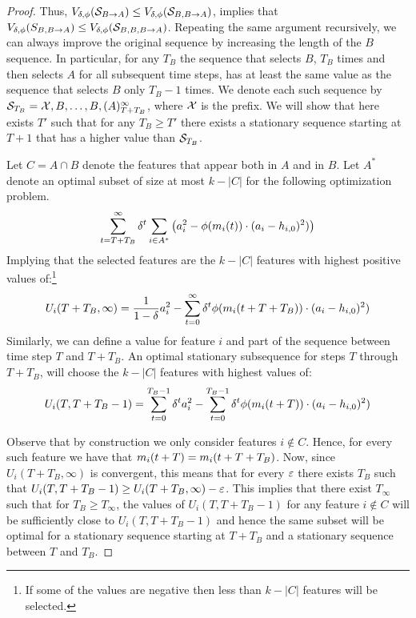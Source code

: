 \begin{proof}
Thus, $V_{\delta,\phi}(\mathcal{S}_{B \rightarrow A}) \leq V_{\delta,\phi}(\mathcal{S}_{B,B\rightarrow A})$,  implies that $V_{\delta,\phi}(S_{B,B \rightarrow A}) \leq V_{\delta,\phi}(\mathcal{S}_{B,B,B\rightarrow A})$. Repeating the same argument recursively, we can always improve the original sequence by increasing the length of the $B$ sequence. In particular, for any $T_B$ the sequence that selects $B$, $T_B$ times and then selects $A$ for all subsequent time steps, has at least the same value as the sequence that selects $B$ only $T_B-1$ times. We denote each such sequence by $\mathcal{S}_{T_B}= \mathcal{X},{B,\ldots, B}, (A)_{T+T_B}^{\infty}$, where $\mathcal{X}$ is the prefix. We will show that here exists $T'$ such that for any $T_B\geq T'$ there exists a stationary sequence starting at $T+1$ that has a higher value than $\mathcal{S}_{T_B}$.   




Let $C=A\cap B$ denote the features that appear both in $A$ and in $B$.
Let $A^*$ denote an optimal subset of size at most $k-|C| $ for the following optimization problem.
\begin{align*}
    \sum_{t=T+T_B}^\infty \delta^t \sum_{i\in A^*} \left( a_i^2 - \phi(m_{i}(t))\cdot(a_i-h_{i,0})^2) \right)
\end{align*}
Implying that the selected features are the $k-|C|$ features with highest positive values of:\footnote{If some of the values are negative then less than $k-|C|$ features will be selected.}
\begin{align*}
  U_i(T+T_B, \infty) =  \frac{1}{1-\delta} a_i^2 - \sum_{t=0}^\infty \delta^t \phi(m_{i}(t+T+T_B))\cdot (a_i-h_{i,0})^2 )
\end{align*}
Similarly, we can define a value for feature $i$ and part of the sequence between time step $T$ and $T+T_B$. An optimal stationary subsequence for steps $T$ through $T+T_B$, will choose the $k-|C|$ features with highest values of:  
\begin{align*}
U_i(T, T+T_B-1) =  \sum_{t=0}^{T_B-1} \delta^{t} a_i^2 - \sum_{t=0}^{T_B-1} \delta^t \phi(m_{i}(t+T))\cdot (a_i-h_{i,0})^2 )
\end{align*}

Observe that by construction we only consider features $i \not \in C$. Hence, for every such feature we have that $m_{i}(t+T) =m_{i}(t+T+T_B)$. Now, since $U_i(T+T_B, \infty)$ is convergent, this means that for every $\varepsilon$ there exists $T_B$ such that $U_i(T, T+T_B-1)\geq U_i(T+T_B, \infty) - \varepsilon$. This implies that there exist $T_\infty$ such that for $T_B\geq T_\infty$, the values of $U_i(T, T+T_B-1)$ for any feature $i \not \in C$ will be sufficiently close to $U_i(T, T+T_B-1)$ and hence the same subset will be optimal for a stationary sequence starting at $T+T_B$ and a stationary sequence between $T$ and $T_B$. 



    
    
\end{proof}
